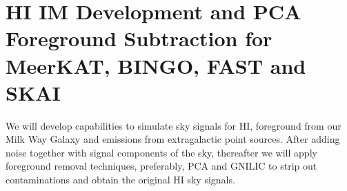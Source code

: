 \chapter[HI IM Development]{HI IM Development and PCA Foreground Subtraction for MeerKAT, BINGO, FAST and SKAI}
We will develop capabilities to simulate sky signals for HI, foreground from our Milk Way Galaxy and emissions from extragalactic point sources. After adding noise together with signal components of the sky, 
thereafter we will apply foreground removal techniques, preferably, PCA and GNILIC to strip out contaminations and obtain the original HI sky signals.